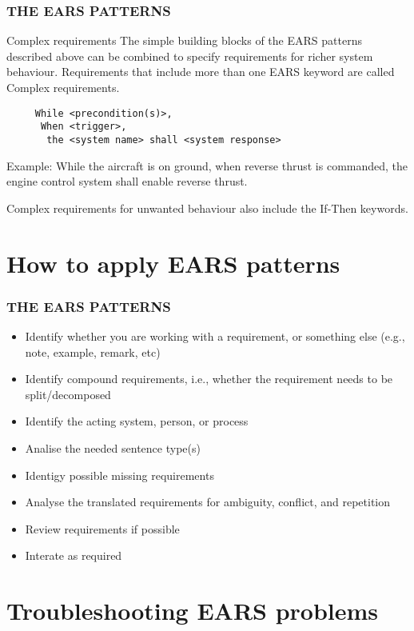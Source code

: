\documentclass[aspectratio=169]{beamer}
\begin{document}
\begin{frame}[fragile]
  \frametitle{THE EARS PATTERNS}
  \begin{block}{Complex requirements}
  The simple building blocks of the EARS patterns described above can be combined to specify requirements for richer system behaviour. Requirements that include more than one EARS keyword are called Complex requirements.
    \begin{verbatim}
     While <precondition(s)>, 
      When <trigger>, 
       the <system name> shall <system response> 
    \end{verbatim}
    Example: While the aircraft is on ground, when reverse thrust is commanded, the engine control system shall enable reverse thrust.

Complex requirements for unwanted behaviour also include the If-Then keywords.
  \end{block}

\end{frame}

\section*{How to apply EARS patterns}

\begin{frame}[fragile]
  \frametitle{THE EARS PATTERNS}
  \begin{itemize}
  \item Identify whether you are working with a requirement, or something else (e.g., note, example, remark, etc)
  \item Identify compound requirements, i.e., whether the requirement needs to be split/decomposed 
  \item Identify the acting system, person, or process
  \item Analise the needed sentence type(s)
  \item Identigy possible missing requirements
  \item Analyse the translated requirements for ambiguity, conflict, and repetition
  \item Review requirements if possible
  \item Interate as required
  \end{itemize}

\end{frame}

\section*{Troubleshooting EARS problems}
\end{document}
